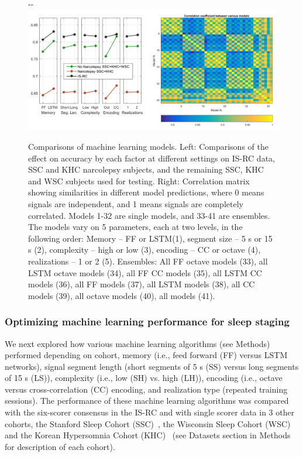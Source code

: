 \begin{figure}
\begin{adjustwidth*}{}{-\marginparwidth-\marginparsep}
    \includegraphics[width=\linewidth]{figures/paper-iii/SuppFigure_1.png}
    \caption[Comparisons of machine learning models]{Comparisons of machine learning models. Left: Comparisons of the effect on accuracy by each factor at different settings on \ac{IS-RC} data, \ac{SSC} and \ac{KHC} narcolepsy subjects, and the remaining \ac{SSC}, \ac{KHC} and \ac{WSC} subjects used for testing. Right: Correlation matrix showing similarities in different model predictions, where 0 means signals are independent, and 1 means signals are completely correlated. Models 1-32 are single models, and 33-41 are ensembles. The models vary on 5 parameters, each at two levels, in the following order: Memory – FF or \ac{LSTM}(1), segment size – 5 s or 15 s (2), complexity – high or low (3), encoding – \ac{CC} or octave (4), realizations – 1 or 2 (5). Ensembles: All FF octave models (33), all \ac{LSTM} octave models (34), all FF \ac{CC} models (35), all \ac{LSTM} \ac{CC} models (36), all FF models (37), all \ac{LSTM} models (38), all \ac{CC} models (39), all octave models (40), all models (41).}
    \label{fig:sleep-stages:paper-iii:figure-s01}
\end{adjustwidth*}
\end{figure}

\subsubsection{Optimizing machine learning performance for sleep staging}
We next explored how various machine learning algorithms (see Methods) performed depending on cohort, memory (i.e., feed forward (FF) versus \ac{LSTM} networks), signal segment length (short segments of 5 s (SS) versus long segments of 15 s (LS)), complexity (i.e., low (SH) vs. high (LH)), encoding (i.e., octave versus cross-correlation (\ac{CC}) encoding, and realization type (repeated training sessions).
The performance of these machine learning algorithms was compared with the six-scorer consensus in the \ac{IS-RC} and with single scorer data in 3 other cohorts, the Stanford Sleep Cohort (\ac{SSC})~\cite{Andlauer2013,Moore2014}, the Wisconsin Sleep Cohort (WSC)~\cite{Young2009,Moore2014} and the Korean Hypersomnia Cohort (\ac{KHC})~\cite{Hong2006,Andlauer2013} (see Datasets section in Methods for description of each cohort).

